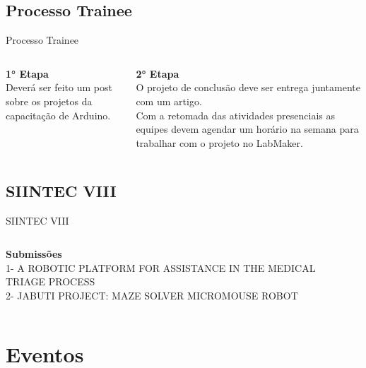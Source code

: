 \subsection*{Processo Trainee}

\begin{frame}{Processo Trainee}
    \begin{columns}
        \centering
        \begin{column}{0.4\textwidth}
            \textbf{1° Etapa} \\
            \small
            Deverá ser feito um post sobre os projetos da capacitação de Arduino.

        \end{column}
        \begin{column}{0.5\textwidth}
            \textbf{2° Etapa} \\
            \small
            O projeto de conclusão deve ser entrega juntamente com um artigo.\\
            Com a retomada das atividades presenciais as equipes devem agendar um horário na semana para trabalhar com o projeto no LabMaker.
        \end{column}
    \end{columns}
\end{frame}

\subsection*{SIINTEC VIII}

\begin{frame}{SIINTEC VIII}
    \begin{columns}
        \centering
        \begin{column}{\textwidth}
            \textbf{Submissões} \\
            \small
            1- A ROBOTIC PLATFORM FOR ASSISTANCE IN THE MEDICAL TRIAGE PROCESS\\
            2- JABUTI PROJECT: MAZE SOLVER MICROMOUSE ROBOT

        \end{column}
        \begin{column}{0.001\textwidth}
\end{column}
    \end{columns}
\end{frame}

\section{Eventos}

